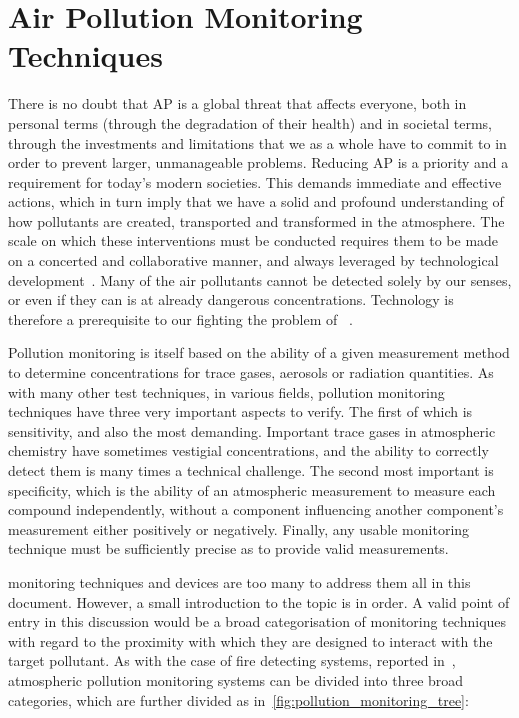 
\section{Air Pollution Monitoring Techniques}%
\label{sec:intro_air_pollution_monitoring_techniques}

There is no doubt that \gls{AP} is a global threat that affects
everyone, both in personal terms (through the degradation of their
health) and in societal terms, through the investments and limitations
that we as a whole have to commit to in order to prevent larger,
unmanageable problems. Reducing \gls{AP} is a priority and a requirement
for today's modern societies. This demands immediate and effective
actions, which in turn imply that we have a solid and profound
understanding of how pollutants are created, transported and transformed
in the atmosphere. The scale on which these interventions must be
conducted requires them to be made on a concerted and collaborative
manner, and always leveraged by technological
development~\cite{EEA2019}. Many of the air pollutants cannot be
detected solely by our senses, or even if they can is at already
dangerous concentrations. Technology is therefore a prerequisite to our
fighting the problem of ~\cite{Vallero2014}.

Pollution monitoring is itself based on the ability of a given
measurement method to determine concentrations for trace gases, aerosols
or radiation quantities. As with many other test techniques, in various
fields, pollution monitoring techniques have three very important
aspects to verify. The first of which is sensitivity, and also the most
demanding. Important trace gases in atmospheric chemistry have sometimes
vestigial concentrations, and the ability to correctly detect them is
many times a technical challenge. The second most important is
specificity, which is the ability of an atmospheric measurement to
measure each compound independently, without a component influencing
another component's measurement either positively or negatively.
Finally, any usable monitoring technique must be sufficiently precise as
to provide valid measurements.

 monitoring techniques and devices are too many to address
them all in this document. However, a small introduction to the topic is
in order. A valid point of entry in this discussion would be a broad
categorisation of monitoring techniques with regard to the proximity
with which they are designed to interact with the target pollutant.
As with the case of fire detecting systems, reported
in~\cite{ValentedeAlmeida2017}, atmospheric pollution monitoring systems
can be divided into three broad categories, which are further divided as
in~\ref{fig:pollution_monitoring_tree}:

